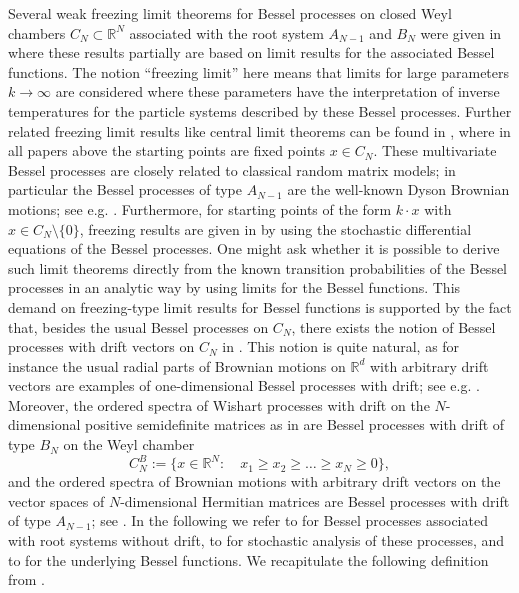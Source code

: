 \documentclass[reqno]{amsart}
\theoremstyle{plain}
\theoremstyle{definition}
\numberwithin{equation}{section}
\begin{document}
Several weak freezing limit theorems for Bessel processes on closed Weyl chambers $C_N\subset\mathbb R^N$
associated with the root system $A_{N-1}$ and $B_N$ were given in \cite{AKM1, AKM2, AM, AnV2} where these results partially
are based on limit results for the associated Bessel functions. The notion ``freezing limit'' here means that limits for
large  parameters $k\to\infty$ are considered where these parameters have the interpretation
of inverse temperatures for the particle systems described by these Bessel processes.
Further related freezing limit results like central limit theorems can be found
in \cite{DE, V1, AHV, GK}, where in all papers above the starting points are
fixed points $x\in C_N$. These multivariate Bessel processes
 are closely related to classical random matrix models;
 in particular the Bessel processes of type $A_{N-1}$ are the well-known Dyson Brownian motions;
 see e.g. \cite{AGZ, Kat, F}.
Furthermore, for starting points of the form $k\cdot x$ with $x\in C_N\setminus\{0\}$,
 freezing results are given in \cite{AnV1, VW} by using the stochastic differential equations of the Bessel processes.
One might ask whether it is possible to derive such limit theorems directly from the known transition probabilities
of the Bessel processes in an analytic way by using limits for the Bessel functions.
This demand on freezing-type limit results for Bessel functions
is supported by the fact that, besides the usual Bessel processes
on $C_N$, there exists the notion of  Bessel processes with drift vectors on $C_N$ in \cite{V2}.
This notion is quite natural, as for instance the usual radial parts of  Brownian motions on $\mathbb R^d$ with arbitrary
drift vectors are examples of one-dimensional Bessel processes with drift; see e.g. \cite{PY}. Moreover,
the ordered spectra of Wishart processes with drift on the $N$-dimensional positive semidefinite matrices
as in \cite{DDMY} are Bessel processes with drift of type $B_N$ on the Weyl chamber
$$C_N^B:=\{x\in \mathbb R^N: \quad x_1\ge x_2\ge\ldots\ge x_N\ge 0 \},$$
and the ordered spectra of
Brownian motions with arbitrary drift vectors on the vector spaces of  $N$-dimensional Hermitian matrices are
Bessel processes with drift of type $A_{N-1}$; see \cite{AuV, V2}.
In the following we refer to \cite{R2, RV} for Bessel processes associated with  root systems without drift,
to \cite{CGY} for stochastic analysis of these processes, and
to \cite{D, R3, A} for
the underlying Bessel functions. We recapitulate the following definition from \cite{V2}.
\end{document}
